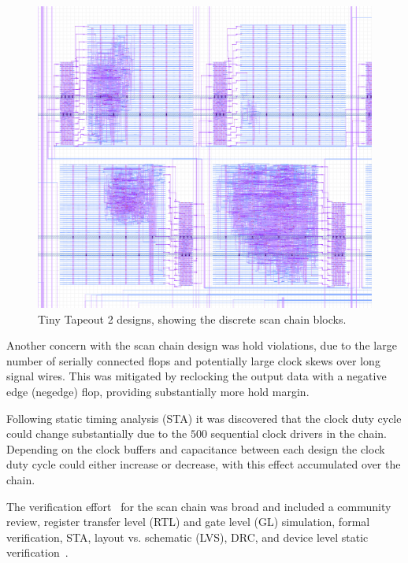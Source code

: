 \begin{figure}[!t]
\centering
\includegraphics[width=\columnwidth]{./Figs/tt02_gds_zoom.png}
\caption{Tiny Tapeout 2 designs, showing the discrete scan chain blocks.}
\label{fig:TT02_separate_scan_blocks}
\end{figure}

Another concern with the scan chain design was hold violations, due to the large number of serially connected flops and potentially large clock skews over long signal wires. This was mitigated by reclocking the output data with a negative edge (negedge) flop, providing substantially more hold margin.

Following static timing analysis (STA) it was discovered that the clock duty cycle could change substantially due to the \(500\) sequential clock drivers in the chain. Depending on the clock buffers and capacitance between each design the clock duty cycle could either increase or decrease, with this effect accumulated over the chain.

The verification effort~\cite{verificationmd} for the scan chain was broad and included a community review, register transfer level (RTL) and gate level (GL) simulation, formal verification\cite{sby}, STA, layout vs. schematic (LVS), DRC, and device level static verification~\cite{cvc}.
